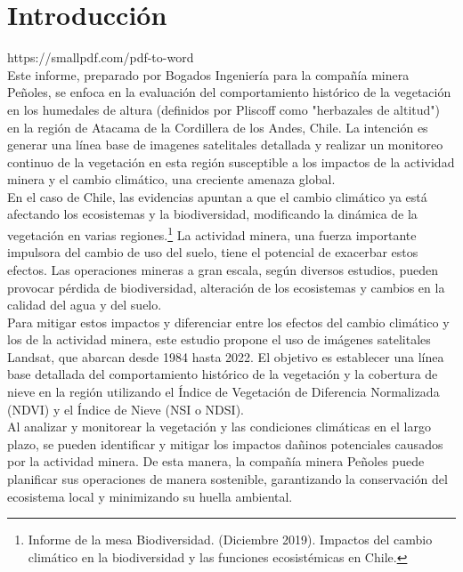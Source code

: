 \maketitle
\section{Introducción}

https://smallpdf.com/pdf-to-word \\

Este informe, preparado por Bogados Ingeniería para la compañía minera Peñoles, se enfoca en la evaluación del comportamiento histórico de la vegetación en los humedales de altura (definidos por Pliscoff como "herbazales de altitud") en la región de Atacama de la Cordillera de los Andes, Chile. La intención es generar una línea base de imagenes satelitales detallada  y realizar un monitoreo continuo de la vegetación en esta región susceptible a los impactos de la actividad minera y el cambio climático, una creciente amenaza global.\\

En el caso de Chile, las evidencias apuntan a que el cambio climático ya está afectando los ecosistemas y la biodiversidad, modificando la dinámica de la vegetación en varias regiones.\footnote{Informe de la mesa Biodiversidad. (Diciembre 2019). Impactos del cambio climático en la biodiversidad y las funciones ecosistémicas en Chile.} La actividad minera, una fuerza importante impulsora del cambio de uso del suelo, tiene el potencial de exacerbar estos efectos. Las operaciones mineras a gran escala, según diversos estudios, pueden provocar pérdida de biodiversidad, alteración de los ecosistemas y cambios en la calidad del agua y del suelo.\\

Para mitigar estos impactos y diferenciar entre los efectos del cambio climático y los de la actividad minera, este estudio propone el uso de imágenes satelitales Landsat, que abarcan desde 1984 hasta 2022. El objetivo es establecer una línea base detallada del comportamiento histórico de la vegetación y la cobertura de nieve en la región utilizando el Índice de Vegetación de Diferencia Normalizada (NDVI) y el Índice de Nieve (NSI o NDSI).\\

Al analizar y monitorear la vegetación y las condiciones climáticas en el largo plazo, se pueden identificar y mitigar los impactos dañinos potenciales causados por la actividad minera. De esta manera, la compañía minera Peñoles puede planificar sus operaciones de manera sostenible, garantizando la conservación del ecosistema local y minimizando su huella ambiental.\\


